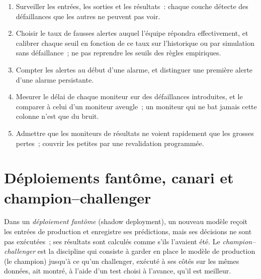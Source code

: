 \begin{method}\label{met:ml:mon:design}
\begin{enumerate}
\item Surveiller les entrées, les sorties et les résultats~: chaque couche détecte des défaillances que les autres ne peuvent pas voir.
\item Choisir le taux de fausses alertes auquel l'équipe répondra effectivement, et calibrer chaque seuil en fonction de ce taux sur l'historique ou par simulation
sans défaillance~; ne pas reprendre les seuils des règles empiriques.
\item Compter les alertes au début d'une alarme, et distinguer une première alerte d'une alarme persistante.
\item Mesurer le délai de chaque moniteur sur des défaillances introduites, et le comparer à celui d'un moniteur aveugle~; un moniteur qui ne bat jamais
cette colonne n'est que du bruit.
\item Admettre que les moniteurs de résultats ne voient rapidement que les grosses pertes~; couvrir les petites par une revalidation programmée.
\end{enumerate}
\end{method}

\section{Déploiements fantôme, canari et champion--challenger}

\begin{definition}\label{def:ml:monitoring-and-retraining:shadow}
Dans un \emph{déploiement fantôme} (shadow deployment), un nouveau modèle reçoit les entrées de production et enregistre ses prédictions,
mais ses décisions ne sont pas exécutées~; ses résultats sont calculés comme s'ils l'avaient été. Le \emph{champion--challenger}
est la discipline qui consiste à garder en place le modèle de production (le champion) jusqu'à ce qu'un challenger, exécuté à ses côtés sur les mêmes données,
ait montré, à l'aide d'un test choisi à l'avance, qu'il est meilleur.
\end{definition}

